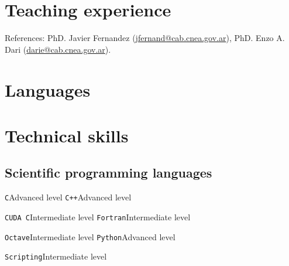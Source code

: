\documentclass[11pt,a4paper,sans]{moderncv}        %
\begin{document}
\section{Teaching experience}

{References: PhD. Javier Fernandez (\href{mailto:jfernand@cab.cnea.gov.ar}{jfernand@cab.cnea.gov.ar}), PhD. Enzo A. Dari (\href{mailto:darie@cab.cnea.gov.ar}{darie@cab.cnea.gov.ar}).}

\section{Languages}


\section{Technical skills}

\subsection{Scientific programming languages}

\cvdoubleitem
{\texttt{C}}{Advanced level}
{\texttt{C++}}{Advanced level}

\cvdoubleitem
{\texttt{CUDA C}}{Intermediate level}
{\texttt{Fortran}}{Intermediate level}

\cvdoubleitem
{\texttt{Octave}}{Intermediate level} 
{\texttt{Python}}{Advanced level}

\cvitem
{\texttt{Scripting}}{Intermediate level}
\end{document}
